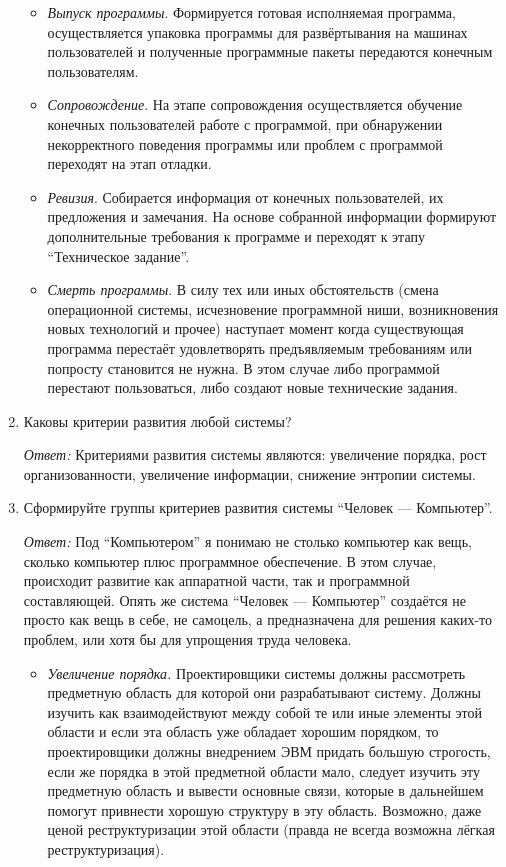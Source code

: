 \documentclass[10pt]{article}
\begin{document}
\begin{enumerate}
\begin{itemize}
  \item{\emph{Выпуск программы}. Формируется готовая исполняемая программа, осуществляется упаковка программы для развёртывания на машинах пользователей и полученные программные пакеты передаются конечным пользователям.}
  \item{\emph{Сопровождение}. На этапе сопровождения осуществляется обучение конечных пользователей работе с программой, при обнаружении некорректного поведения программы или проблем с программой переходят на этап отладки.}
  \item{\emph{Ревизия}. Собирается информация от конечных пользователей, их предложения и замечания. На основе собранной информации формируют дополнительные требования к программе и переходят к этапу ``Техническое задание''.}
  \item{\emph{Смерть программы}. В силу тех или иных обстоятельств (смена операционной системы, исчезновение программной ниши, возникновения новых технологий и прочее) наступает момент когда существующая программа перестаёт удовлетворять предъявляемым требованиям или попросту становится не нужна. В этом случае либо программой перестают пользоваться, либо создают новые технические задания.}
  \end{itemize}

\item{Каковы критерии развития любой системы?}

  \emph{Ответ:} Критериями развития системы являются: увеличение порядка, рост организованности, увеличение информации, снижение энтропии системы.

\item{Сформируйте группы критериев развития системы ``Человек --- Компьютер''.}

  \emph{Ответ:} Под ``Компьютером'' я понимаю не столько компьютер как вещь, сколько компьютер плюс программное обеспечение. В этом случае, происходит развитие как аппаратной части, так и программной составляющей. Опять же система ``Человек --- Компьютер'' создаётся не просто как вещь в себе, не самоцель, а предназначена для решения каких-то проблем, или хотя бы для упрощения труда человека.

  \begin{itemize}
  \item{\emph{Увеличение порядка.} Проектировщики системы должны рассмотреть предметную область для которой они разрабатывают систему. Должны изучить как взаимодействуют между собой те или иные элементы этой области и если эта область уже обладает хорошим порядком, то проектировщики должны внедрением ЭВМ придать большую строгость, если же порядка в этой предметной области мало, следует изучить эту предметную область и вывести основные связи, которые в дальнейшем помогут привнести хорошую структуру в эту область. Возможно, даже ценой реструктуризации этой области (правда не всегда возможна лёгкая реструктуризация).}


\end{itemize}
\end{enumerate}
\end{document}
